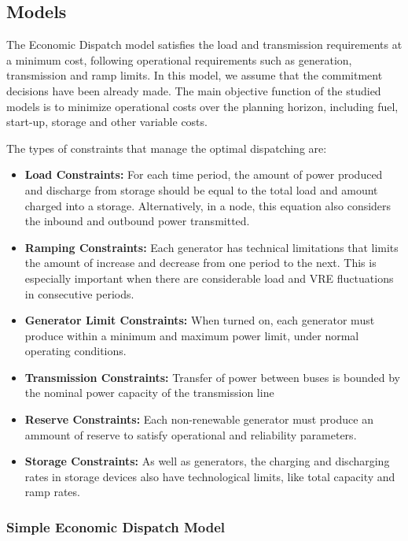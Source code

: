 \documentclass[12pt,LUDisStyle,twosided]{book}
\begin{document}
\subsection{Models}
The Economic Dispatch model satisfies the load and transmission requirements at a minimum cost, following operational requirements such as generation, transmission and ramp limits. In this model, we assume that the commitment decisions have been already made. The main objective function of the studied models is to minimize operational costs over the planning horizon, including fuel, start-up, storage and other variable costs.

The types of constraints that manage the optimal dispatching are:

\begin{itemize}
\item \textbf{Load Constraints:} For each time period, the amount of power produced and discharge from storage should be equal to the total load and amount charged into a storage. Alternatively, in a node, this equation also considers the inbound and outbound power transmitted.
\item \textbf{Ramping Constraints:}  Each generator has technical limitations that limits the amount of increase and decrease from one period to the next. This is especially important when there are considerable load and VRE fluctuations in consecutive periods.
\item \textbf{Generator Limit Constraints:} When turned on, each generator must produce within a minimum and maximum power limit, under normal operating conditions.
\item \textbf{Transmission Constraints:} Transfer of power between buses is bounded by the nominal power capacity of the transmission line
\item \textbf{Reserve Constraints:} Each non-renewable generator must produce an ammount of reserve to satisfy operational and reliability parameters.
\item \textbf{Storage Constraints:} As well as generators, the charging and discharging rates in storage devices also have technological limits, like total capacity and ramp rates.


\end{itemize}

\subsubsection{Simple Economic Dispatch Model}
\end{document}
